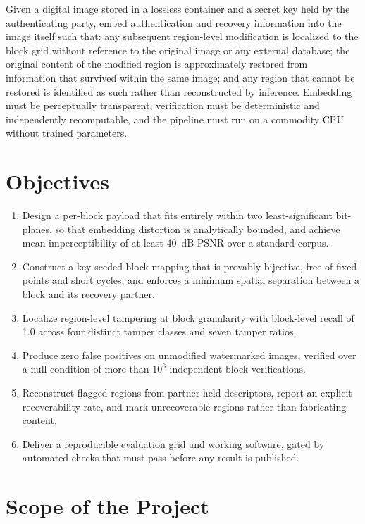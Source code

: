 \documentclass[12pt,a4paper]{article}
\begin{document}
Given a digital image stored in a lossless container and a secret key held by
the authenticating party, embed authentication and recovery information into
the image itself such that: any subsequent region-level modification is
localized to the block grid without reference to the original image or any
external database; the original content of the modified region is
approximately restored from information that survived within the same image;
and any region that cannot be restored is identified as such rather than
reconstructed by inference. Embedding must be perceptually transparent,
verification must be deterministic and independently recomputable, and the
pipeline must run on a commodity CPU without trained parameters.

\section{Objectives}

\begin{enumerate}[label=\textbf{O\arabic*.},leftmargin=*]
\item Design a per-block payload that fits entirely within two least-significant
bit-planes, so that embedding distortion is analytically bounded, and achieve mean
imperceptibility of at least 40~dB PSNR over a standard corpus.
\item Construct a key-seeded block mapping that is provably bijective, free of
fixed points and short cycles, and enforces a minimum spatial separation between
a block and its recovery partner.
\item Localize region-level tampering at block granularity with block-level
recall of 1.0 across four distinct tamper classes and seven tamper ratios.
\item Produce zero false positives on unmodified watermarked images, verified over
a null condition of more than $10^{6}$ independent block verifications.
\item Reconstruct flagged regions from partner-held descriptors, report an
explicit recoverability rate, and mark unrecoverable regions rather than
fabricating content.
\item Deliver a reproducible evaluation grid and working software, gated by
automated checks that must pass before any result is published.
\end{enumerate}

\section{Scope of the Project}
\end{document}
